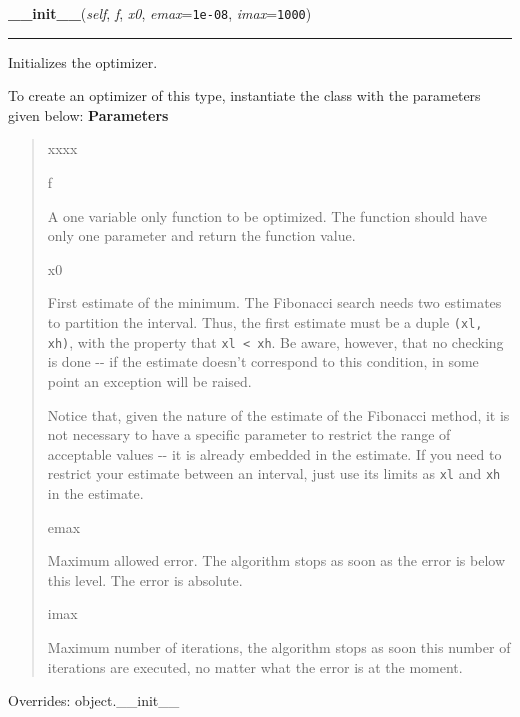\hspace{.8\funcindent}\begin{boxedminipage}{\funcwidth}

    \raggedright \textbf{\_\_init\_\_}(\textit{self}, \textit{f}, \textit{x0}, \textit{emax}={\tt 1e-08}, \textit{imax}={\tt 1000})

    \vspace{-1.5ex}

    \rule{\textwidth}{0.5\fboxrule}
\setlength{\parskip}{2ex}

Initializes the optimizer.

To create an optimizer of this type, instantiate the class with the
parameters given below:
\setlength{\parskip}{1ex}
      \textbf{Parameters}
      \vspace{-1ex}

      \begin{quote}
        \begin{Ventry}{xxxx}

          \item[f]


A one variable only function to be optimized. The function should
have only one parameter and return the function value.
          \item[x0]


First estimate of the minimum. The Fibonacci search needs two
estimates to partition the interval. Thus, the first estimate must
be a duple \texttt{(xl, xh)}, with the property that \texttt{xl < xh}. Be
aware, however, that no checking is done -{}- if the estimate doesn't
correspond to this condition, in some point an exception will be
raised.

Notice that, given the nature of the estimate of the Fibonacci
method, it is not necessary to have a specific parameter to restrict
the range of acceptable values -{}- it is already embedded in the
estimate. If you need to restrict your estimate between an interval,
just use its limits as \texttt{xl} and \texttt{xh} in the estimate.
          \item[emax]


Maximum allowed error. The algorithm stops as soon as the error is
below this level. The error is absolute.
          \item[imax]


Maximum number of iterations, the algorithm stops as soon this
number of iterations are executed, no matter what the error is at
the moment.
        \end{Ventry}

      \end{quote}

      Overrides: object.\_\_init\_\_

    \end{boxedminipage}

